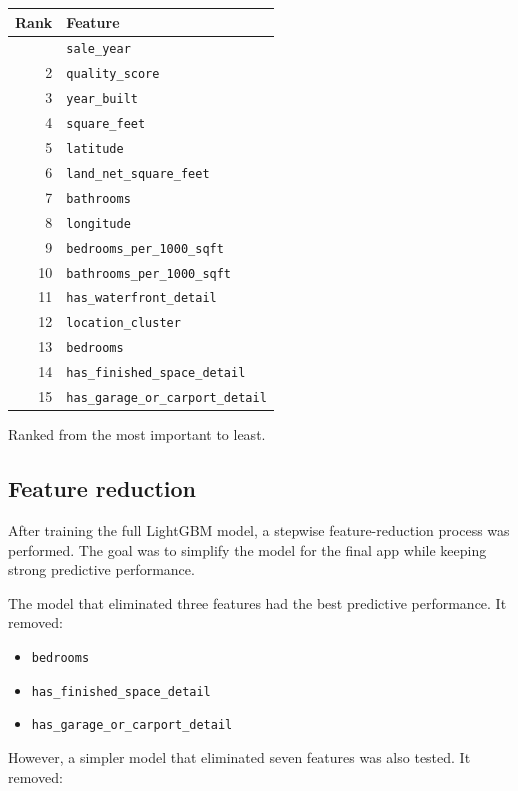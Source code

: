 \documentclass[
  english,
  letterpaper,
  DIV=11,
  numbers=noendperiod]{scrreprt}
\providecommand{\tightlist}{%
  \setlength{\itemsep}{0pt}\setlength{\parskip}{0pt}}
\begin{document}
\begin{longtable}[]{@{}rl@{}}
\toprule\noalign{}
Rank & Feature \\
\midrule\noalign{}
\endhead
\bottomrule\noalign{}
\endlastfoot
1 & \texttt{sale\_year} \\
2 & \texttt{quality\_score} \\
3 & \texttt{year\_built} \\
4 & \texttt{square\_feet} \\
5 & \texttt{latitude} \\
6 & \texttt{land\_net\_square\_feet} \\
7 & \texttt{bathrooms} \\
8 & \texttt{longitude} \\
9 & \texttt{bedrooms\_per\_1000\_sqft} \\
10 & \texttt{bathrooms\_per\_1000\_sqft} \\
11 & \texttt{has\_waterfront\_detail} \\
12 & \texttt{location\_cluster} \\
13 & \texttt{bedrooms} \\
14 & \texttt{has\_finished\_space\_detail} \\
15 & \texttt{has\_garage\_or\_carport\_detail} \\
\end{longtable}

Ranked from the most important to least.

\subsection{Feature reduction}\label{feature-reduction}

After training the full LightGBM model, a stepwise feature-reduction
process was performed. The goal was to simplify the model for the final
app while keeping strong predictive performance.

The model that eliminated three features had the best predictive
performance. It removed:

\begin{itemize}
\tightlist
\item
  \texttt{bedrooms}
\item
  \texttt{has\_finished\_space\_detail}
\item
  \texttt{has\_garage\_or\_carport\_detail}
\end{itemize}

However, a simpler model that eliminated seven features was also tested.
It removed:
\end{document}
